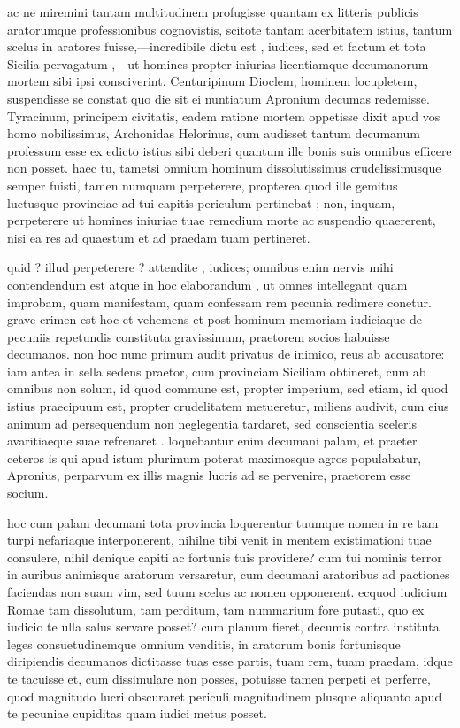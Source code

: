  ac ne miremini tantam multitudinem profugisse quantam ex litteris publicis aratorumque professionibus cognovistis, scitote tantam acerbitatem istius, tantum scelus in aratores fuisse,—incredibile dictu est , iudices, sed et factum et tota Sicilia pervagatum ,—ut homines propter iniurias licentiamque decumanorum mortem sibi ipsi consciverint. Centuripinum Dioclem, hominem locupletem, suspendisse se constat quo die sit ei nuntiatum Apronium decumas redemisse. Tyracinum, principem civitatis, eadem ratione mortem oppetisse dixit apud vos homo nobilissimus, Archonidas Helorinus, cum audisset tantum decumanum professum esse ex edicto istius sibi deberi quantum ille bonis suis omnibus efficere non posset. haec tu, tametsi omnium hominum dissolutissimus crudelissimusque semper fuisti, tamen numquam perpeterere, propterea quod ille gemitus luctusque provinciae ad tui capitis periculum pertinebat ; non, inquam, perpeterere ut homines iniuriae tuae remedium morte ac suspendio quaererent, nisi ea res ad quaestum et ad praedam tuam pertineret.

 quid ? illud perpeterere ? attendite , iudices; omnibus enim nervis mihi contendendum est atque in hoc elaborandum , ut omnes intellegant quam improbam, quam manifestam, quam confessam rem pecunia redimere conetur. grave crimen est hoc et vehemens et post hominum memoriam iudiciaque de pecuniis repetundis constituta gravissimum, praetorem socios habuisse decumanos. non hoc nunc primum audit privatus de inimico, reus ab accusatore: iam antea in sella sedens praetor, cum provinciam Siciliam obtineret, cum ab omnibus non solum, id quod commune est, propter imperium, sed etiam, id quod istius praecipuum est, propter crudelitatem metueretur, miliens audivit, cum eius animum ad persequendum non neglegentia tardaret, sed conscientia sceleris avaritiaeque suae refrenaret . loquebantur enim decumani palam, et praeter ceteros is qui apud istum plurimum poterat maximosque agros populabatur, Apronius, perparvum ex illis magnis lucris ad se pervenire, praetorem esse socium.

 hoc cum palam decumani tota provincia loquerentur tuumque nomen in re tam turpi nefariaque interponerent, nihilne tibi venit in mentem existimationi tuae consulere, nihil denique capiti ac fortunis tuis providere? cum tui nominis terror in auribus animisque aratorum versaretur, cum decumani aratoribus ad pactiones faciendas non suam vim, sed tuum scelus ac nomen opponerent. ecquod iudicium Romae tam dissolutum, tam perditum, tam nummarium fore putasti, quo ex iudicio te ulla salus servare posset? cum planum fieret, decumis contra instituta leges consuetudinemque omnium venditis, in aratorum bonis fortunisque diripiendis decumanos dictitasse tuas esse partis, tuam rem, tuam praedam, idque te tacuisse et, cum dissimulare non posses, potuisse tamen perpeti et perferre, quod magnitudo lucri obscuraret periculi magnitudinem plusque aliquanto apud te pecuniae cupiditas quam iudici metus posset.

